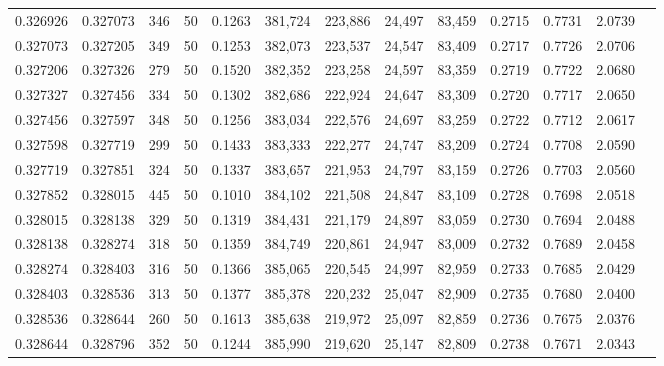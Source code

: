 \begin{tabular}{rrrrrrrrrrrrr}
0.326926 & 0.327073 &   346 &  50 &                                     0.1263 & 381,724 & 223,886 &  24,497 &  83,459 & 0.2715 & 0.7731 & 2.0739 \\
0.327073 & 0.327205 &   349 &  50 &                                     0.1253 & 382,073 & 223,537 &  24,547 &  83,409 & 0.2717 & 0.7726 & 2.0706 \\
0.327206 & 0.327326 &   279 &  50 &                                     0.1520 & 382,352 & 223,258 &  24,597 &  83,359 & 0.2719 & 0.7722 & 2.0680 \\
0.327327 & 0.327456 &   334 &  50 &                                     0.1302 & 382,686 & 222,924 &  24,647 &  83,309 & 0.2720 & 0.7717 & 2.0650 \\
0.327456 & 0.327597 &   348 &  50 &                                     0.1256 & 383,034 & 222,576 &  24,697 &  83,259 & 0.2722 & 0.7712 & 2.0617 \\
0.327598 & 0.327719 &   299 &  50 &                                     0.1433 & 383,333 & 222,277 &  24,747 &  83,209 & 0.2724 & 0.7708 & 2.0590 \\
0.327719 & 0.327851 &   324 &  50 &                                     0.1337 & 383,657 & 221,953 &  24,797 &  83,159 & 0.2726 & 0.7703 & 2.0560 \\
0.327852 & 0.328015 &   445 &  50 &                                     0.1010 & 384,102 & 221,508 &  24,847 &  83,109 & 0.2728 & 0.7698 & 2.0518 \\
0.328015 & 0.328138 &   329 &  50 &                                     0.1319 & 384,431 & 221,179 &  24,897 &  83,059 & 0.2730 & 0.7694 & 2.0488 \\
0.328138 & 0.328274 &   318 &  50 &                                     0.1359 & 384,749 & 220,861 &  24,947 &  83,009 & 0.2732 & 0.7689 & 2.0458 \\
0.328274 & 0.328403 &   316 &  50 &                                     0.1366 & 385,065 & 220,545 &  24,997 &  82,959 & 0.2733 & 0.7685 & 2.0429 \\
0.328403 & 0.328536 &   313 &  50 &                                     0.1377 & 385,378 & 220,232 &  25,047 &  82,909 & 0.2735 & 0.7680 & 2.0400 \\
0.328536 & 0.328644 &   260 &  50 &                                     0.1613 & 385,638 & 219,972 &  25,097 &  82,859 & 0.2736 & 0.7675 & 2.0376 \\
0.328644 & 0.328796 &   352 &  50 &                                     0.1244 & 385,990 & 219,620 &  25,147 &  82,809 & 0.2738 & 0.7671 & 2.0343 \\

\end{tabular}
